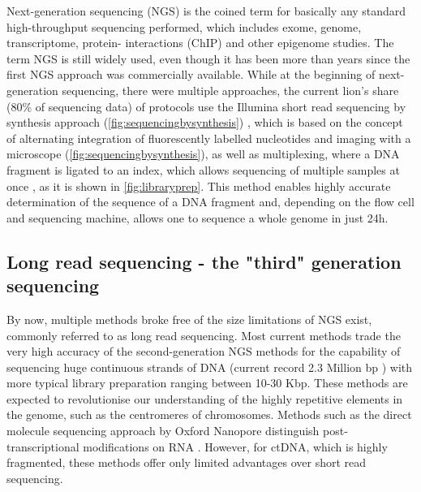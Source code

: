 Next-generation sequencing (NGS) is the coined term for basically any standard high-throughput sequencing performed, which includes exome, genome, transcriptome, \linebreak protein- interactions (ChIP) and other epigenome studies. The term NGS is still widely used, even though it has been more than  years since the first NGS approach was commercially available. While at the beginning of next-generation sequencing, there were multiple approaches, the current lion's share (80\% of sequencing data) of protocols use the Illumina short read sequencing by synthesis approach (\autoref{fig:sequencingbysynthesis}) \cite{Mardis2008,Straiton2019}, which is based on the concept of alternating integration of fluorescently labelled nucleotides and imaging with a microscope (\autoref{fig:sequencingbysynthesis}), as well as multiplexing, where a DNA fragment is ligated to an index, which allows sequencing of multiple samples at once \cite{Church1984,Church1988}, as it is shown in \autoref{fig:libraryprep}. This method enables highly accurate determination of the sequence of a DNA fragment and, depending on the flow cell and sequencing machine, allows one to sequence a whole genome in just 24h.

\subsection[Long read sequencing]{Long read sequencing - the "third" generation sequencing}
\label{intro-sec:lrs}
By now, multiple methods  broke free of the size limitations of NGS exist,  commonly referred to as long read sequencing. Most  current methods trade the very high accuracy of the second-generation NGS methods for the capability of sequencing huge continuous strands of DNA (current record 2.3 Million bp \cite{Payne2018}) with more typical library preparation ranging between 10-30 Kbp. 
These methods are expected to revolutionise our understanding of the highly repetitive elements  in the genome, such as the centromeres of chromosomes. Methods such as the direct molecule sequencing approach by Oxford Nanopore  distinguish post-transcriptional modifications on RNA \cite{Pratanwanich2021}.
However, for ctDNA, which is highly fragmented, these methods offer only limited advantages over  short read sequencing.

